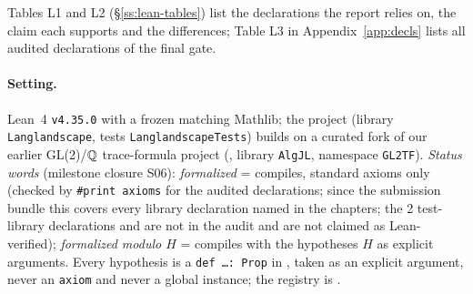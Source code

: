 

Tables L1 and L2 (\S\ref{ss:lean-tables}) list the declarations the report relies on, the claim each supports and the differences; Table L3 in Appendix~\ref{app:decls} lists all \GateAudited{} audited declarations of the final gate.

\paragraph{Setting.} Lean~4 \texttt{v4.35.0} with a frozen matching Mathlib; the project 
(library \texttt{Langlandscape}, tests \texttt{LanglandscapeTests}) builds on a curated fork of our earlier GL(2)/$\mathbb{Q}$
trace-formula project (, library \texttt{AlgJL}, namespace \texttt{GL2TF}).
\emph{Status words} (milestone closure S06): \emph{formalized} = compiles, standard axioms only (checked by \texttt{\#print axioms} for the \NumAuditedRows{} audited declarations; since the submission bundle this covers every library declaration named in the chapters; the 2 test-library declarations  and  are not in the audit and are not claimed as Lean-verified); \emph{formalized modulo
$H$} = compiles with the hypotheses $H$ as explicit arguments. Every hypothesis is a \texttt{def \dots : Prop} in
, taken as an explicit argument, never an \texttt{axiom} and never a global instance; the registry
is .

